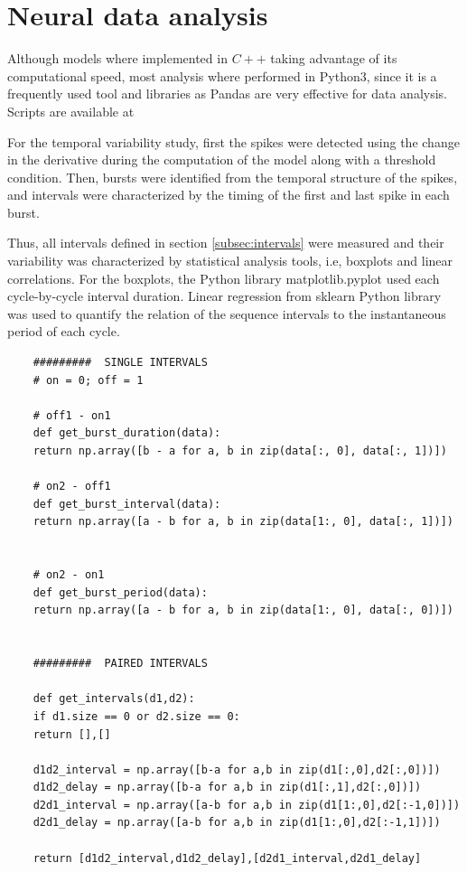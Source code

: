  
\section{Neural data analysis}
Although models where implemented in $C++$ taking advantage of its computational speed, most analysis where performed in Python3, since it is a frequently used tool and libraries as Pandas are very effective for data analysis. 
Scripts are available at 


For the temporal variability study, first the spikes were detected using the change in the derivative during the computation of the model along with a threshold condition. Then, bursts were identified from the temporal structure of the spikes, and intervals were characterized by the timing of the first and last spike in each burst. 

Thus, all intervals defined in section \ref{subsec:intervals} were measured and their variability was characterized by statistical analysis tools, i.e, boxplots and linear correlations. For the boxplots, the Python library matplotlib.pyplot used each cycle-by-cycle interval duration. Linear regression from sklearn Python library was used to quantify the relation of the sequence intervals to the instantaneous period of each cycle. 

\begin{lstlisting}
	#########  SINGLE INTERVALS
	# on = 0; off = 1
	
	# off1 - on1
	def get_burst_duration(data):
	return np.array([b - a for a, b in zip(data[:, 0], data[:, 1])])
	
	# on2 - off1
	def get_burst_interval(data):
	return np.array([a - b for a, b in zip(data[1:, 0], data[:, 1])])
	
	
	# on2 - on1
	def get_burst_period(data):
	return np.array([a - b for a, b in zip(data[1:, 0], data[:, 0])])
	
	
	#########  PAIRED INTERVALS
	
	def get_intervals(d1,d2):
	if d1.size == 0 or d2.size == 0:
	return [],[]
	
	d1d2_interval = np.array([b-a for a,b in zip(d1[:,0],d2[:,0])])
	d1d2_delay = np.array([b-a for a,b in zip(d1[:,1],d2[:,0])])
	d2d1_interval = np.array([a-b for a,b in zip(d1[1:,0],d2[:-1,0])])
	d2d1_delay = np.array([a-b for a,b in zip(d1[1:,0],d2[:-1,1])])
	
	return [d1d2_interval,d1d2_delay],[d2d1_interval,d2d1_delay]
\end{lstlisting}




